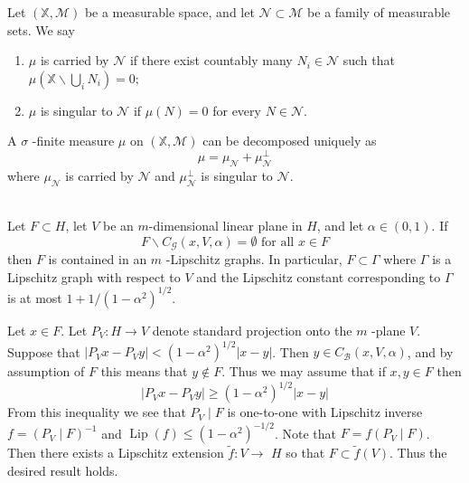 \begin{definition}
   Let $(\mathbb{X}, \mathcal{M})$ be a measurable space, and let $\mathcal{N} \subset \mathcal{M}$ be a family of measurable sets. We say
   \begin{enumerate}[(1)]
       \item $\mu$ is carried by $\mathcal{N}$ if there exist countably many $N_{i} \in \mathcal{N}$ such that $\mu\left(\mathbb{X} \backslash \bigcup_{i} N_{i}\right)=0$;
       \item $\mu$ is singular to $\mathcal{N}$ if $\mu(N)=0$ for every $N \in \mathcal{N}$.    
   \end{enumerate}
   A $\sigma$ -finite measure $\mu$ on $(\mathbb{X}, \mathcal{M})$ can be decomposed uniquely as
       $$
       \mu=\mu_{\mathcal{N}}+\mu_{\mathcal{N}}^{\perp}
       $$
       where $\mu_{\mathcal{N}}$ is carried by $\mathcal{N}$ and $\mu_{\mathcal{N}}^{\perp}$ is singular to $\mathcal{N}$. 
\end{definition}

\begin{theorem} $ $\\
    Let $F \subset H$, let $V$ be an $m$-dimensional linear plane in $H$, and let $\alpha \in(0,1) .$ If
$$
F \backslash C_{\mathcal{G}}(x, V, \alpha)=\emptyset \text { for all } x \in F
$$
then $F$ is contained in an $m$ -Lipschitz graphs. In particular, $F \subset \Gamma$ where $\Gamma$ is a Lipschitz graph with respect to $V$ and the Lipschitz constant corresponding to $\Gamma$ is at most $1+1 /\left(1-\alpha^{2}\right)^{1 / 2} .$
\end{theorem}
\proof Let $x \in F$. Let $P_{V}: H \rightarrow V$ denote standard projection onto the $m$ -plane $V$. Suppose that $\left|P_{V} x-P_{V} y\right|<\left(1-\alpha^{2}\right)^{1 / 2}|x-y|$. Then $y \in C_{\mathcal{B}}(x, V, \alpha)$, and by assumption of $F$ this means that $y \notin F$. Thus we may assume that if $x, y \in F$ then
$$
\left|P_{V} x-P_{V} y\right| \geq\left(1-\alpha^{2}\right)^{1 / 2}|x-y|
$$
From this inequality we see that $P_{V} \mid F$ is one-to-one with Lipschitz inverse $f=\left(P_{V} \mid F\right)^{-1}$ and $\operatorname{Lip}(f) \leq\left(1-\alpha^{2}\right)^{-1 / 2}$. Note that $F=f\left(P_{V} \mid F\right)$. Then there exists a Lipschitz extension $\tilde{f}: V \rightarrow$ $H$ so that $F \subset \tilde{f}(V)$. Thus the desired result holds. 


